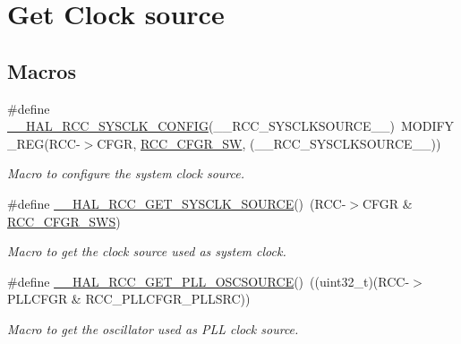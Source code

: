 \hypertarget{group___r_c_c___get___clock__source}{}\section{Get Clock source}
\label{group___r_c_c___get___clock__source}
\subsection*{Macros}
\begin{DoxyCompactItemize}
\item 
\#define \mbox{\hyperlink{group___r_c_c___get___clock__source_ga32f72b8c5b7e97b415867c57f9fafed6}{\+\_\+\+\_\+\+H\+A\+L\+\_\+\+R\+C\+C\+\_\+\+S\+Y\+S\+C\+L\+K\+\_\+\+C\+O\+N\+F\+IG}}(\+\_\+\+\_\+\+R\+C\+C\+\_\+\+S\+Y\+S\+C\+L\+K\+S\+O\+U\+R\+C\+E\+\_\+\+\_\+)~M\+O\+D\+I\+F\+Y\+\_\+\+R\+EG(R\+CC-\/$>$C\+F\+GR, \mbox{\hyperlink{group___peripheral___registers___bits___definition_ga0eea5e5f7743a7e8995b8beeb18355c1}{R\+C\+C\+\_\+\+C\+F\+G\+R\+\_\+\+SW}}, (\+\_\+\+\_\+\+R\+C\+C\+\_\+\+S\+Y\+S\+C\+L\+K\+S\+O\+U\+R\+C\+E\+\_\+\+\_\+))
\begin{DoxyCompactList}\small\item\em Macro to configure the system clock source. \end{DoxyCompactList}\item 
\#define \mbox{\hyperlink{group___r_c_c___get___clock__source_gac99c2453d9e77c8b457acc0210e754c2}{\+\_\+\+\_\+\+H\+A\+L\+\_\+\+R\+C\+C\+\_\+\+G\+E\+T\+\_\+\+S\+Y\+S\+C\+L\+K\+\_\+\+S\+O\+U\+R\+CE}}()~(R\+CC-\/$>$C\+F\+GR \& \mbox{\hyperlink{group___peripheral___registers___bits___definition_ga15bf2269500dc97e137315f44aa015c9}{R\+C\+C\+\_\+\+C\+F\+G\+R\+\_\+\+S\+WS}})
\begin{DoxyCompactList}\small\item\em Macro to get the clock source used as system clock. \end{DoxyCompactList}\item 
\#define \mbox{\hyperlink{group___r_c_c___get___clock__source_ga3ea1390f8124e2b3b8d53e95541d6e53}{\+\_\+\+\_\+\+H\+A\+L\+\_\+\+R\+C\+C\+\_\+\+G\+E\+T\+\_\+\+P\+L\+L\+\_\+\+O\+S\+C\+S\+O\+U\+R\+CE}}()~((uint32\+\_\+t)(R\+CC-\/$>$P\+L\+L\+C\+F\+GR \& R\+C\+C\+\_\+\+P\+L\+L\+C\+F\+G\+R\+\_\+\+P\+L\+L\+S\+RC))
\begin{DoxyCompactList}\small\item\em Macro to get the oscillator used as P\+LL clock source. \end{DoxyCompactList}\end{DoxyCompactItemize}


